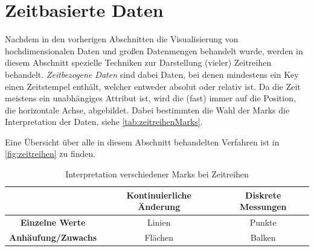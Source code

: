 	\section{Zeitbasierte Daten}
		\label{sec:visZeitbasiert}

		Nachdem in den vorherigen Abschnitten die Visualisierung von hochdimensionalen Daten und großen Datenmengen behandelt wurde, werden in diesem Abschnitt spezielle Techniken zur Darstellung (vieler) Zeitreihen behandelt. \emph{Zeitbezogene Daten} sind dabei Daten, bei denen mindestens ein Key einen Zeitstempel enthält, welcher entweder absolut oder relativ ist. Da die Zeit meistens ein unabhängiges Attribut ist, wird die (fast) immer auf die Position, \zB die horizontale Achse, abgebildet. Dabei bestimmten die Wahl der Marks die Interpretation der Daten, siehe \autoref{tab:zeitreihenMarks}.

		Eine Übersicht über alle in diesem Abschnitt behandelten Verfahren ist in \autoref{fig:zeitreihen} zu finden.

		\begin{table}
			\centering
			\begin{tabular}{c|cc}
				\toprule
				                           & \textbf{Kontinuierliche Änderung} & \textbf{Diskrete Messungen} \\ \midrule
				 \textbf{Einzelne Werte}   &              Linien               &           Punkte            \\
				\textbf{Anhäufung/Zuwachs} &              Flächen              &           Balken            \\ \bottomrule
			\end{tabular}
			\caption{Interpretation verschiedener Marks bei Zeitreihen}
			\label{tab:zeitreihenMarks}
		\end{table}

